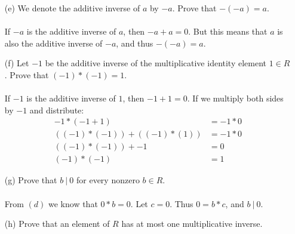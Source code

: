 \documentclass[11pt,fleqn]{article}
\begin{document}
\begin{itemize}
  
\item[(e)] We denote the additive inverse of $a$ by $-a$.  Prove that $-(-a) = a$.\\
  \\
If $-a$ is the additive inverse of $a$, then $-a + a = 0$.  But this means that $a$ is also the additive inverse of $-a$, and thus $-(-a) = a$.
  
\item[(f)] Let $-1$ be the additive inverse of the multiplicative identity element $1 \in R$.  Prove that $(-1)*(-1) = 1$.\\
  \\
If $-1$ is the additive inverse of $1$, then $-1 + 1 = 0$.  If we multiply both sides by $-1$ and distribute:
\begin{align}
  -1 * (-1 + 1) &= -1 * 0\nonumber\\
  ((-1) * (-1)) + ((-1) * (1)) &= -1 * 0\nonumber\\
  ((-1) * (-1)) + -1 &= 0\nonumber\\
  (-1) * (-1) &= 1\nonumber
\end{align}
  
\item[(g)] Prove that $b\:|\:0$ for every nonzero $b \in R$.\\
  \\
  From $(d)$ we know that $0 * b = 0$.  Let $c = 0$.  Thus $0 = b * c$, and $b\:|\:0$.
  
\item[(h)] Prove that an element of $R$ has at most one multiplicative inverse.\\
  \\
  
\end{itemize}
\end{document}
